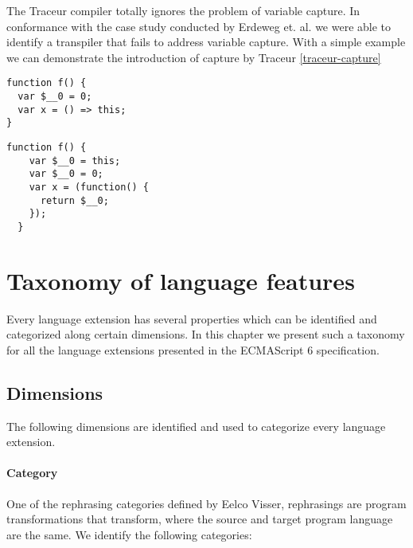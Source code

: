 The Traceur compiler totally ignores the problem of variable capture. In conformance with the case study conducted by Erdeweg et. al. \cite{Erdweg2014} we were able to identify a transpiler that fails to address variable capture. With a simple example we can demonstrate the introduction of capture by Traceur \ref{traceur-capture}

\begin{lstlisting}[label=traceur-capture, caption=Example input to Traceur\protect\footnotemark]
function f() {
  var $__0 = 0;
  var x = () => this; 
}
\end{lstlisting}

\begin{lstlisting}[caption=Variable capture]
function f() {
    var $__0 = this;
    var $__0 = 0;
    var x = (function() {
      return $__0;
    });
  }
\end{lstlisting}

\section{Taxonomy of language features}

Every language extension has several properties which can be identified and categorized along certain dimensions. In this chapter we present such a taxonomy for all the language extensions presented in the ECMAScript 6 specification\cite{SpecJS}.

\subsection{Dimensions}
The following dimensions are identified and used to categorize every language extension.

\paragraph{Category}
One of the rephrasing categories defined by Eelco Visser\cite{Visser2001}, rephrasings are program transformations that transform, where the source and target program language are the same. We identify the following categories:
\\ 

